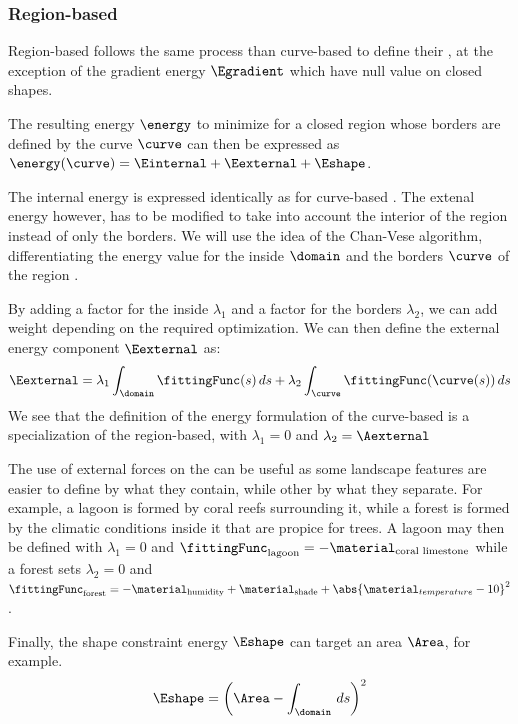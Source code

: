 \subsubsection{Region-based }

Region-based  follows the same process than curve-based  to define their , at the exception of the gradient energy $\Egradient$ which have null value on closed shapes. 

The resulting energy $\energy$ to minimize for a closed region whose borders are defined by the curve $\curve$ can then be expressed as $\energy(\curve) = \Einternal + \Eexternal + \Eshape$.

The internal energy is expressed identically as for curve-based . The extenal energy however, has to be modified to take into account the interior of the region instead of only the borders. We will use the idea of the Chan-Vese algorithm, differentiating the energy value for the inside $\domain$ and the borders $\curve$ of the region \cite{Chan2001, Getreuer2012}.

By adding a factor for the inside $\lambda_1$ and a factor for the borders $\lambda_2$, we can add weight depending on the required optimization. We can then define the external energy component $\Eexternal$ as:
\begin{align}
    \Eexternal = \lambda_1 \int_{\domain}{ \fittingFunc(s) \, ds } + \lambda_2 \int_{\curve}{ \fittingFunc(\curve(s)) \, ds }
\end{align}
We see that the definition of the energy formulation of the curve-based  is a specialization of the region-based, with $\lambda_1 = 0$ and $\lambda_2 = \Aexternal$

The use of external forces on the  can be useful as some landscape features are easier to define by what they contain, while other by what they separate. For example, a lagoon is formed by coral reefs surrounding it, while a forest is formed by the climatic conditions inside it that are propice for trees. A lagoon may then be defined with $\lambda_1 = 0$ and $\fittingFunc_{\text{lagoon}} = -\material_{\text{coral limestone}}$ while a forest sets $\lambda_2 = 0$ and $\fittingFunc_{\text{forest}} = -\material_{\text{humidity}} + \material_{\text{shade}} + \abs{\material_{temperature} - 10}^2$.

Finally, the shape constraint energy $\Eshape$ can target an area $\Area$, for example.
\begin{align}
    \Eshape = \left( \Area - \int_{\domain}{ \, ds } \right)^2
\end{align}

